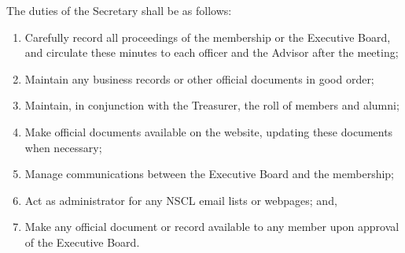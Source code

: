 \documentclass{bylaws_nofont}
\newcommand{\NSCL}{\textsc{NSCL}\xspace}
\begin{document}
\begin{linenumbers}[1]
\begin{enumerate}
    \sub[Secretary] The duties of the Secretary shall be as follows:
    \begin{enumerate}
    \item Carefully record all proceedings of the membership or the
      Executive Board, and circulate these minutes to each officer and
      the Advisor after the meeting;
    \item Maintain any business records or other official documents in
      good order;
    \item Maintain, in conjunction with the Treasurer, the roll of
      members and alumni;
    \item Make official documents available on the website, updating
      these documents when necessary;
    \item Manage communications between the Executive Board and the
      membership;
    \item Act as administrator for any \NSCL email lists or webpages;
      and,
    \item Make any official document or record available to any member
      upon approval of the Executive Board.
    \end{enumerate}
    

\end{enumerate}
\end{linenumbers}
\end{document}
